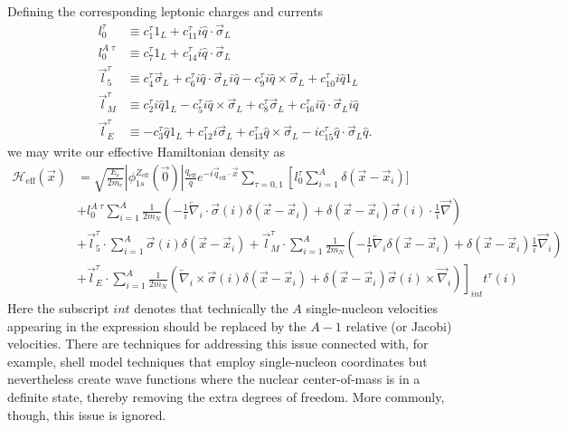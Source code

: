 \documentclass[12pt,letterpaper]{book}
\begin{document}
Defining the corresponding leptonic charges and currents
\begin{equation}
\begin{split}
l_0^{\tau}&\equiv c_1^{\tau}1_L+c_{11}^{\tau}i\hat{q}\cdot\vec{\sigma}_L\\
l_0^{A\;\tau}&\equiv c_7^{\tau}1_L+c_{14}^{\tau}i\hat{q}\cdot\vec{\sigma}_L\\
\vec{l}_5^{\tau}&\equiv c_4^{\tau}\vec{\sigma}_L+c_6^{\tau}i\hat{q}\cdot\vec{\sigma}_Li\hat{q}-c_9^{\tau}i\hat{q}\times\vec{\sigma}_L+c_{10}^{\tau}i\hat{q}1_L\\
\vec{l}_M^{\tau}&\equiv c_2^{\tau}i\hat{q}1_L-c_5^{\tau}i\hat{q}\times\vec{\sigma}_L+c_8^{\tau}\vec{\sigma}_L+c_{16}^{\tau}i\hat{q}\cdot\vec{\sigma}_Li\hat{q}\\
\vec{l}_E^{\tau}&\equiv -c_3^{\tau}\hat{q}1_L+c_{12}^{\tau}i\vec{\sigma}_L+c_{13}^{\tau}\hat{q}\times\vec{\sigma}_L-ic_{15}^{\tau}\hat{q}\cdot\vec{\sigma}_L\hat{q}.
\label{eq:leptonic_currents}
\end{split}
\end{equation}
we may write our effective Hamiltonian density as
\begin{equation}
\begin{split}
\mathcal{H}_\mathrm{eff}(\vec{x})&=\sqrt{\frac{E_e}{2m_e}}|\phi_{1s}^{Z_\mathrm{eff}}(\vec{0})|\frac{q_\mathrm{eff}}{q}e^{-i\vec{q}_\mathrm{eff}\cdot\vec{x}}\sum_{\tau=0,1}\left[l_0^{\tau}\sum_{i=1}^A\delta(\vec{x}-\vec{x}_i)]\right.\\
&\left.+l_0^{A\;\tau}\sum_{i=1}^A\frac{1}{2m_N}\left(-\frac{1}{i}\overleftarrow{\nabla}_i\cdot\vec{\sigma}(i)\delta(\vec{x}-\vec{x}_i)+\delta(\vec{x}-\vec{x}_i)\vec{\sigma}(i)\cdot\frac{1}{i}\overrightarrow{\nabla}\right)\right.\\
&+\vec{l}_5^{\tau}\cdot\sum_{i=1}^A\vec{\sigma}(i)\delta(\vec{x}-\vec{x}_i)+\vec{l}_M^{\tau}\cdot\sum_{i=1}^A\frac{1}{2m_N}\left(-\frac{1}{i}\overleftarrow{\nabla}_i\delta(\vec{x}-\vec{x}_i)+\delta(\vec{x}-\vec{x}_i)\frac{1}{i}\overrightarrow{\nabla}_i\right)\\
&\left.+\vec{l}_E^{\tau}\cdot\sum_{i=1}^A\frac{1}{2m_N}\left(\overleftarrow{\nabla}_i\times\vec{\sigma}(i)\delta(\vec{x}-\vec{x}_i)+\delta(\vec{x}-\vec{x}_i)\vec{\sigma}(i)\times\overrightarrow{\nabla}_i\right)\right]_{int} t^{\tau}(i)
\end{split}
\label{eq:H_NRET}
\end{equation}
Here the subscript $int$ denotes that technically the $A$ single-nucleon velocities appearing in the expression should be replaced by the $A-1$ relative (or Jacobi) velocities. There are techniques for addressing this issue connected with, for example, shell model techniques that employ single-nucleon coordinates but nevertheless create wave functions where the nuclear center-of-mass is in a definite state, thereby removing the extra degrees of freedom. More commonly, though, this issue is ignored.
\end{document}
